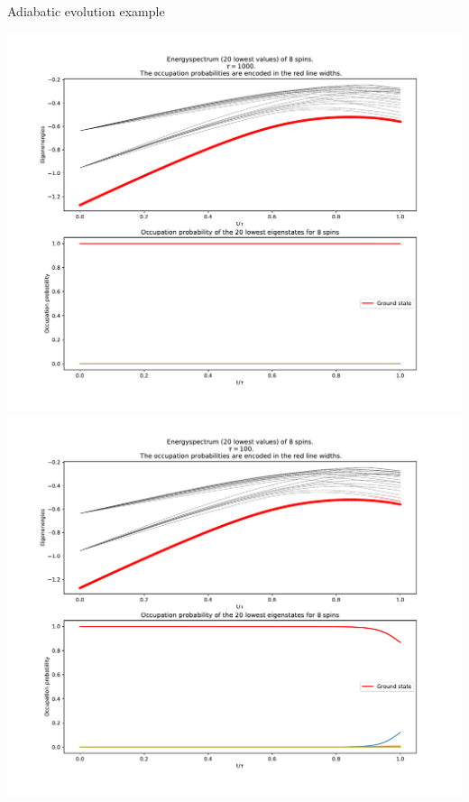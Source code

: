 \begin{frame}[allowframebreaks]{Adiabatic evolution example}
\begin{center}
    \includegraphics[height=0.75\textheight]{pics/adiabatic/adiabatic_1000.pdf}\\
    \includegraphics[height=0.75\textheight]{pics/adiabatic/adiabatic_100.pdf}\\

\end{center}
\end{frame}
